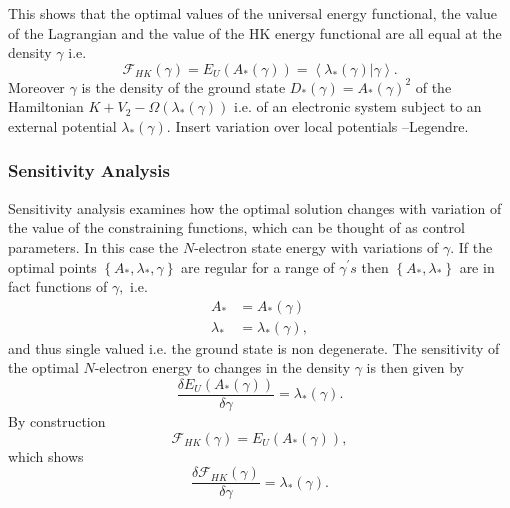 \documentclass[aps,preprint]{revtex4}%
\begin{document}
This shows that the optimal values of the universal energy functional, the
value of the Lagrangian and the value of the HK energy functional are all
equal at the density $\gamma$ i.e.
\begin{equation}
\mathcal{F}_{HK}\left(  \gamma\right)  =E_{U}\left(  A_{\ast}\left(
\gamma\right)  \right)  =\left\langle \left.  \lambda_{\ast}\left(
\gamma\right)  \right\vert \gamma\right\rangle .
\end{equation}
Moreover $\gamma$ is the density of the ground state $D_{\ast}\left(
\gamma\right)  =A_{\ast}\left(  \gamma\right)  ^{2}$ of the Hamiltonian
$K+V_{2}-\Omega\left(  \lambda_{\ast}\left(  \gamma\right)  \right)  $ i.e. of
an electronic system subject to an external potential $\lambda_{\ast}\left(
\gamma\right)  $. \textrm{Insert variation over local potentials --Legendre. }

\subsubsection{Sensitivity Analysis}

Sensitivity analysis \cite{sensitivity} examines how the optimal solution
changes with variation of the value of the constraining functions, which can
be thought of as control parameters. In this case the $N$-electron state
energy with variations of $\gamma.$ If the optimal points $\left\{  A_{\ast
},\lambda_{\ast},\gamma\right\}  $ are regular for a range of $\gamma^{\prime
}s$ then $\left\{  A_{\ast},\lambda_{\ast}\right\}  $ are in fact functions of
$\gamma,$ i.e.
\begin{align}
A_{\ast}  &  =A_{\ast}\left(  \gamma\right) \nonumber\\
\lambda_{\ast}  &  =\lambda_{\ast}\left(  \gamma\right)  ,
\end{align}
and thus single valued i.e. the ground state is non degenerate. The
sensitivity of the optimal $N$-electron energy to changes in the density
$\gamma$ is then given by
\begin{equation}
\frac{\delta E_{U}\left(  A_{\ast}\left(  \gamma\right)  \right)  }%
{\delta\gamma}=\lambda_{\ast}\left(  \gamma\right)  .
\end{equation}
By construction
\begin{equation}
\mathcal{F}_{HK}\left(  \gamma\right)  =E_{U}\left(  A_{\ast}\left(
\gamma\right)  \right)  ,
\end{equation}
which shows
\begin{equation}
\frac{\delta\mathcal{F}_{HK}\left(  \gamma\right)  }{\delta\gamma}%
=\lambda_{\ast}\left(  \gamma\right)  .
\end{equation}
\end{document}
